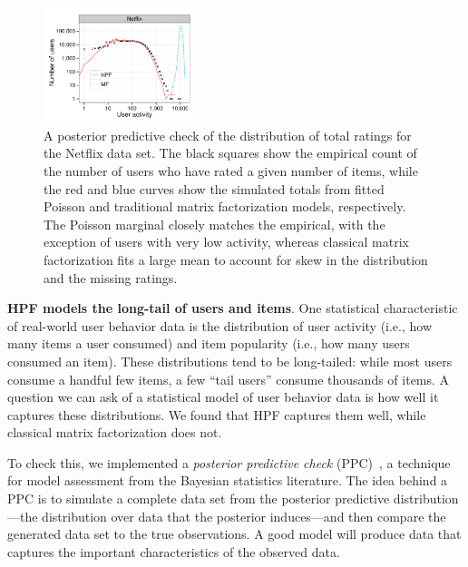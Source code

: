 \begin{figure}[t!]
  \centering
  \includegraphics[width=0.4\textwidth]{figures/user_activity_sim_netflix.pdf}
  \caption{A posterior predictive check of the distribution of total
    ratings for the Netflix data set.  The black squares show the
    empirical count of the number of users who have rated a given
    number of items, while the red and blue curves show the
    simulated totals from fitted Poisson and traditional matrix
    factorization models, respectively. The Poisson marginal closely
    matches the empirical, with the exception of users with very low
    activity, whereas classical matrix factorization fits
    a large mean to account for skew in the distribution and the
    missing ratings.}
\label{fig:marginals}
\end{figure}

{\bf HPF models the long-tail of users and items}.  One statistical
characteristic of real-world user behavior data is the distribution of
user activity (i.e., how many items a user consumed) and item
popularity (i.e., how many users consumed an item).  These
distributions tend to be long-tailed: while most users consume a
handful few items, a few ``tail users'' consume thousands of items.  A
question we can ask of a statistical model of user behavior data is
how well it captures these distributions.  We found that HPF captures
them well, while classical matrix factorization does not.

To check this, we implemented a \textit{posterior predictive check}
(PPC)~\cite{Rubin:1984,Gelman:1996}, a technique for model assessment
from the Bayesian statistics literature.  The idea behind a PPC is to
simulate a complete data set from the posterior predictive
distribution---the distribution over data that the posterior
induces---and then compare the generated data set to the true
observations. A good model will produce data that captures the
important characteristics of the observed data.


